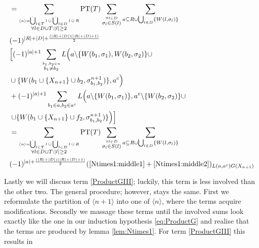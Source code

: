 \documentclass[b5paper,draft,openbib,12pt]{memoir}
\DeclareMathOperator{\dotCup}{\mathop{\dot{\bigcup}}}
\DeclareMathOperator{\dotcup}{\mathop{\dot{\cup}}}
\begin{document}
\begin{align}
&=\sum_{\stackrel{\langle n \rangle = \dotCup_{l\in T}l \dotcup \dotCup_{l\in D}l \dotcup R}{\forall l \in D\cup T: |l|\ge 2}} 
\text{PT}(T) 
\sum_{\stackrel{\forall l \in D }{\sigma_l \in S(l)}} \sum_{a \subseteq R\cup \bigcup_{l \in D}\{W(l,\sigma_l)\}} \\\notag
&(-1)^{|R|+|D|+ \frac{(|R|+|D|)(|R|+|D|+1)}{2}} \\\notag
&\Big[(-1)^{|a|+1}\sum_{\stackrel{b_1,b_2 \in a}{b_1 \neq b_2}}  L\Big(a\backslash\{W(b_1,\sigma_1),W(b_2,\sigma_2)\}\cup\\\notag
&\cup \{W(b_1\cup \{X_{n+1}\}\cup b_2,\sigma^{n+1}_{b_1,b_2})\} ,a^c\Big) \\\notag
&+(-1)^{|a|+1}\sum_{b_1\in a,b_2\in a^c}  L\Big(a\backslash\{W(b_1,\sigma_1)\} ,a^c \backslash\{W(b_2,\sigma_2)\}\cup\\\notag
&\left. \cup \{W(b_1\cup \{X_{n+1}\}\cup f_2,\sigma^{n+1}_{b_1,b_2})\}\Big) \right]\\\notag
&=\sum_{\stackrel{\langle n \rangle = \dotCup_{l\in T}l \dotcup \dotCup_{l\in D}l \dotcup R}{\forall l \in D\cup T: |l|\ge 2}} 
\text{PT}(T) 
\sum_{\stackrel{\forall l \in D }{\sigma_l \in S(l)}} \sum_{a \subseteq R\cup \bigcup_{l \in D}\{W(l,\sigma_l)\}} \\\notag
&(-1)^{|a|+ \frac{(|R|+|D|)(|R|+|D|+1)}{2}} (\eqref{Ntimes1:middle1}+\eqref{Ntimes1:middle2})_{L(a,a^c)G(X_{n+1})}
\end{align}

Lastly we will discuss term \eqref{ProductGIII}; luckily, this term is less involved than the other two. The general procedure;
however, stays the same. First we reformulate the partition of \(\langle n+1\rangle\) into one of \(\langle n \rangle \), where
the terms acquire modifications. Secondly we massage these terms until the involved sums look exactly like the one 
in our induction hypothesis \eqref{eq:ProductG} and realise that the terms are produced by lemma \ref{lem:Ntimes1}.
For term \eqref{ProductGIII}  this results in
\end{document}

